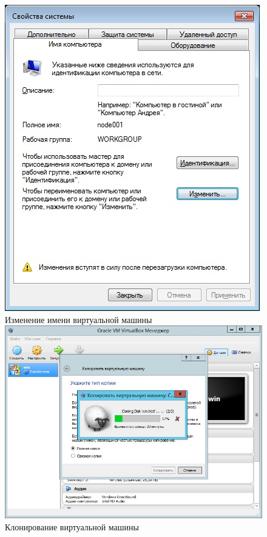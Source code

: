 \documentclass[pscyr,10pt]{hedlab}
\begin{document}
  \begin{figure}[h!]
    \center
    \includegraphics[width=.5\textwidth]{node001}\\
    Изменение имени виртуальной машины\\[2em]
    
    \includegraphics[width=.8\textwidth]{cloning}\\
    Клонирование виртуальной машины
  \end{figure}
  
  \newpage
  
\end{document}
